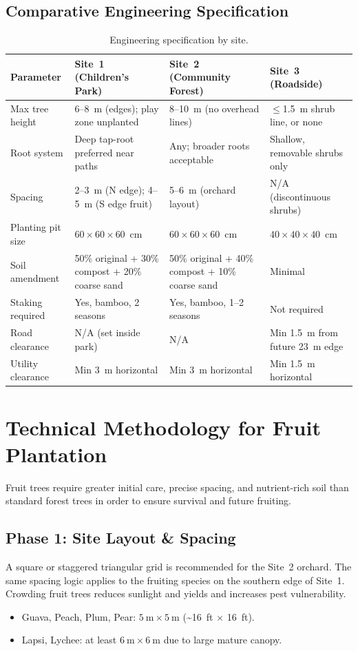\documentclass[11pt,a4paper]{article}
\begin{document}
\subsection{Comparative Engineering Specification}

\begin{table}[H]
\centering
\small
\begin{tabularx}{\linewidth}{L{3.4cm} X X X}
\toprule
\textbf{Parameter} & \textbf{Site~1 (Children's Park)} & \textbf{Site~2 (Community Forest)} & \textbf{Site~3 (Roadside)} \\
\midrule
Max tree height & 6--8~m (edges); play zone unplanted & 8--10~m (no overhead lines) & $\le$1.5~m shrub line, or none \\
Root system & Deep tap-root preferred near paths & Any; broader roots acceptable & Shallow, removable shrubs only \\
Spacing & 2--3~m (N edge); 4--5~m (S edge fruit) & 5--6~m (orchard layout) & N/A (discontinuous shrubs) \\
Planting pit size & $60 \times 60 \times 60$~cm & $60 \times 60 \times 60$~cm & $40 \times 40 \times 40$~cm \\
Soil amendment & 50\% original + 30\% compost + 20\% coarse sand & 50\% original + 40\% compost + 10\% coarse sand & Minimal \\
Staking required & Yes, bamboo, 2 seasons & Yes, bamboo, 1--2 seasons & Not required \\
Road clearance & N/A (set inside park) & N/A & Min 1.5~m from future 23~m edge \\
Utility clearance & Min 3~m horizontal & Min 3~m horizontal & Min 1.5~m horizontal \\
\bottomrule
\end{tabularx}
\caption{Engineering specification by site.}
\end{table}

\section{Technical Methodology for Fruit Plantation}
\label{sec:methodology-fruit}

Fruit trees require greater initial care, precise spacing, and nutrient-rich soil than standard forest trees in order to ensure survival and future fruiting.

\subsection{Phase 1: Site Layout \& Spacing}
A square or staggered triangular grid is recommended for the Site~2 orchard. The same spacing logic applies to the fruiting species on the southern edge of Site~1. Crowding fruit trees reduces sunlight and yields and increases pest vulnerability.
\begin{itemize}
  \item Guava, Peach, Plum, Pear: $5~\text{m} \times 5~\text{m}$ (\textasciitilde 16~ft $\times$ 16~ft).
  \item Lapsi, Lychee: at least $6~\text{m} \times 6~\text{m}$ due to large mature canopy.
\end{itemize}
\end{document}
